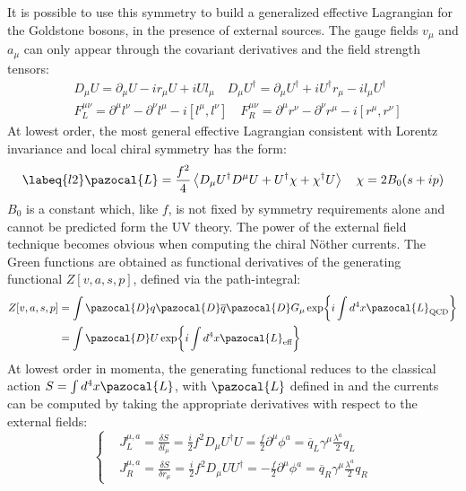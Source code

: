\documentclass[../main.tex]{subfiles}
\begin{document}
It is possible to use this symmetry to build a generalized effective Lagrangian for the
Goldstone bosons, in the presence of external sources. The gauge fields $v_\mu$ and $a_\mu$ can only appear through the covariant derivatives and the field strength tensors:
\[
\begin{aligned}
&D_\mu U=\partial_\mu U-ir_\mu U+iUl_\mu \quad D_\mu U^\dagger=\partial_\mu U^\dagger+iU^\dagger r_\mu-il_\mu U^\dagger\\
&F^{\mu\nu}_L=\partial^\mu l^\nu-\partial^\nu l^\mu-i[l^\mu,l^\nu] \quad F^{\mu\nu}_R=\partial^\mu r^\nu-\partial^\nu r^\mu-i[r^\mu,r^\nu]
\end{aligned}
\]
At lowest order, the most general effective Lagrangian consistent with Lorentz invariance and local chiral symmetry has the form: 
\begin{equation}
\labeq{l2}    
\pazocal{L}=\frac{f^2}{4}\Braket{D_\mu U^\dagger D^\mu U+U^\dagger\chi+\chi^\dagger U} \quad \chi=2B_0(s+ip)
\end{equation}
$B_0$ is a constant which, like $f$, is not fixed by symmetry requirements alone and cannot be predicted form the UV theory. The power of the external field technique becomes obvious when computing the chiral N\"other currents. The Green functions are obtained as
functional derivatives of the generating functional $Z[v,a,s,p]$, defined via
the path-integral:
\begin{align*}
Z[v,a,s,p]&=\int\pazocal{D}q\pazocal{D}\overline{q}\pazocal{D}G_\mu\exp{i\int d^4x\pazocal{L}_{\text{QCD}}}\\
&=\int\pazocal{D}U\exp{i\int d^4x\pazocal{L}_{\text{eff}}}
\end{align*}
At lowest order in momenta, the generating functional reduces to the classical action $S=\int d^4x\pazocal{L}$, with $\pazocal{L}$ defined in  and the currents can be computed by taking the appropriate derivatives with respect to the external fields:
\[
\left\{
\begin{aligned}
&J_L^{\mu,a}=\frac{\delta S}{\delta l_\mu}=\frac{i}{2}f^2D_\mu U^\dagger U=\frac{f}{2}\partial^\mu\phi^a=\overline{q}_L\gamma^\mu\frac{\lambda^a}{2}q_L\\
&J_R^{\mu,a}=\frac{\delta S}{\delta r_\mu}=\frac{i}{2}f^2D_\mu UU^\dagger=-\frac{f}{2}\partial^\mu\phi^a=\overline{q}_R\gamma^\mu\frac{\lambda^a}{2}q_R
\end{aligned}
\right.
\]
\end{document}
